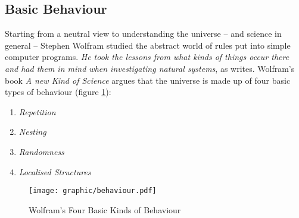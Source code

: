 %
%
%
%
%
%
%

\subsection{Basic Behaviour}
\label{basic_behaviour_heading}

Starting from a neutral view to understanding the universe -- and science in
general -- Stephen Wolfram studied the abstract world of rules put into simple
computer programs. \textit{He took the lessons from what kinds of things occur
there and had them in mind when investigating natural systems}, as
\cite{wikipedia} writes. Wolfram's book \emph{A new Kind of Science}
\cite{wolfram} argues that the universe is made up of four basic types of
behaviour (figure \ref{behaviour_figure}):

\begin{enumerate}
    \item \emph{Repetition}
    \item \emph{Nesting}
    \item \emph{Randomness}
    \item \emph{Localised Structures}
\end{enumerate}

\begin{figure}[ht]
    \begin{center}
        \texttt{[image: graphic/behaviour.pdf]}
        \caption{Wolfram's Four Basic Kinds of Behaviour \cite{wolfram}}
        \label{behaviour_figure}
    \end{center}
\end{figure}

